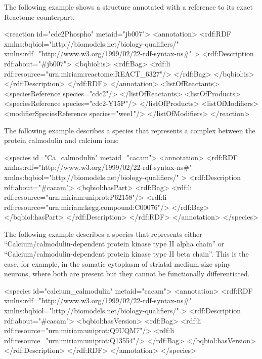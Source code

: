 \changed{}The following example shows a \Reaction structure annotated
with a reference to its exact Reactome counterpart.

\begin{blockChanged}
\begin{example}
<reaction id="cdc2Phospho" metaid="jb007">
  <annotation>
    <rdf:RDF
      xmlns:bqbiol="http://biomodels.net/biology-qualifiers/"
      xmlns:rdf="http://www.w3.org/1999/02/22-rdf-syntax-ns\#"
    >
      <rdf:Description rdf:about="#jb007">
        <bqbiol:is>
          <rdf:Bag>
            <rdf:li rdf:resource="urn:miriam:reactome:REACT_6327"/>
          </rdf:Bag>
        </bqbiol:is>
      </rdf:Description>
    </rdf:RDF>
  </annotation>
  <listOfReactants>
    <speciesReference species="cdc2"/>
  </listOfReactants>
  <listOfProducts>
    <speciesReference species="cdc2-Y15P"/>
  </listOfProducts>
  <listOfModifiers>
    <modifierSpeciesReference species="wee1"/>
  </listOfModifiers>
</reaction>
\end{example}
\end{blockChanged}

The following example describes a species that represents a
complex between the protein calmodulin and calcium ions:

\begin{blockChanged}
\begin{example}
<species id="Ca_calmodulin" metaid="cacam">
  <annotation>
    <rdf:RDF
      xmlns:rdf="http://www.w3.org/1999/02/22-rdf-syntax-ns\#"
      xmlns:bqbiol="http://biomodels.net/biology-qualifiers/"
    >
      <rdf:Description rdf:about="\#cacam">
        <bqbiol:hasPart>
          <rdf:Bag>
            <rdf:li rdf:resource="urn:miriam:uniprot:P62158"/>
            <rdf:li rdf:resource="urn:miriam:kegg.compound:C00076"/>
          </rdf:Bag>
        </bqbiol:hasPart>
      </rdf:Description>
    </rdf:RDF>
  </annotation>
</species>
\end{example}
\end{blockChanged}

The following example describes a species that represents either
``Calcium/calmodulin-dependent protein kinase type II alpha
chain'' or ``Calcium/calmodulin-dependent protein kinase type II
beta chain''. This is the case, for example, in the somatic
cytoplasm of striatal medium-size spiny neurons, where both are
present but they cannot be functionally differentiated.

\begin{blockChanged}
\begin{example}
<species id="calcium_calmodulin" metaid="cacam">
  <annotation>
    <rdf:RDF
      xmlns:rdf="http://www.w3.org/1999/02/22-rdf-syntax-ns\#"
      xmlns:bqbiol="http://biomodels.net/biology-qualifiers/"
    >
      <rdf:Description rdf:about="\#cacam">
        <bqbiol:hasVersion>
          <rdf:Bag>
            <rdf:li rdf:resource="urn:miriam:uniprot:Q9UQM7"/>
            <rdf:li rdf:resource="urn:miriam:uniprot:Q13554"/>
          </rdf:Bag>
        </bqbiol:hasVersion>
      </rdf:Description>
    </rdf:RDF>
  </annotation>
</species>
\end{example}
\end{blockChanged}


